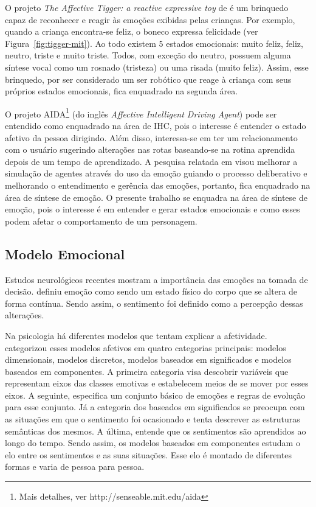 O projeto \emph{The Affective Tigger: a reactive expressive toy} de
\citet{kirsch1999affective} é um brinquedo capaz de reconhecer e reagir às
emoções exibidas pelas crianças. Por exemplo, quando a criança encontra-se
feliz, o boneco expressa felicidade (ver Figura~\ref{fig:tigger-mit}). Ao todo
existem 5 estados emocionais: muito feliz, feliz, neutro, triste e muito
triste. Todos, com exceção do neutro, possuem alguma síntese vocal como um
rosnado (tristeza) ou uma risada (muito feliz). Assim, esse brinquedo, por ser
considerado um ser robótico que reage à criança com seus próprios estados
emocionais, fica enquadrado na segunda área.

O projeto AIDA\footnote{Mais detalhes, ver http://senseable.mit.edu/aida} (do
inglês \emph{Affective Intelligent Driving Agent}) pode ser entendido como
enquadrado na área de IHC, pois o interesse é entender o estado afetivo da
pessoa dirigindo. Além disso, interessa-se em ter um relacionamento com o
usuário sugerindo alterações nas rotas baseando-se na rotina aprendida depois de
um tempo de aprendizado.  A pesquisa relatada em \citet{dias-agents} visou
melhorar a simulação de agentes através do uso da emoção guiando o processo
deliberativo e melhorando o entendimento e gerência das emoções, portanto,
fica enquadrado na área de síntese de emoção. O presente trabalho se enquadra
na área de síntese de emoção, pois o interesse é em entender e gerar estados
emocionais e como esses podem afetar o comportamento de um personagem.

\subsection{Modelo Emocional} \label{ch-ca-mce}

Estudos neurológicos recentes \cite{ledoux1998emotional,damasio2004erro}
mostram a importância das emoções na tomada de decisão.
\citet{damasio2004erro} definiu emoção como sendo um estado físico do corpo
que se altera de forma contínua. Sendo assim, o sentimento foi definido como a
percepção dessas alterações.

Na psicologia há diferentes modelos que tentam explicar a afetividade.
\citet{scherer2000tnoe} categorizou esses modelos afetivos em quatro
categorias principais: modelos dimensionais, modelos discretos, modelos
baseados em significados e modelos baseados em componentes. A primeira
categoria visa descobrir variáveis que representam eixos das classes emotivas
e estabelecem meios de se mover por esses eixos. A seguinte, especifica um
conjunto básico de emoções e regras de evolução para esse conjunto.
Já a categoria dos baseados em significados se preocupa com as situações
em que o sentimento foi ocasionado e tenta descrever as estruturas semânticas dos
mesmos. A última, entende que os sentimentos são aprendidos ao longo do tempo.
Sendo assim, os modelos baseados em componentes estudam o elo entre os
sentimentos e as suas situações. Esse elo é montado de diferentes formas e
varia de pessoa para pessoa.

